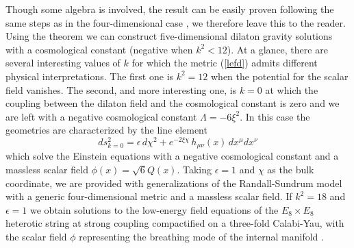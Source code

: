 \documentclass[prd,a4paper,twocolumn,superscriptaddress,nofootinbib,showpacs]{revtex4}
\begin{document}
Though some algebra is involved, the result can be easily proven
 following the same steps as in the four-dimensional case \cite{fonarev},  
we therefore  leave this to the reader. Using the  theorem we can construct five-dimensional dilaton 
gravity solutions with a cosmological
constant (negative when $k^{2}<12$). At a glance, there are several interesting values
of $k$ for which the metric (\ref{lefd}) admits different physical interpretations. The first
one is $k^2=12$ when the potential for the scalar field vanishes. The second, and more interesting one, is
$k=0$ at which the coupling between the dilaton field and the cosmological constant is zero and we are left
with a negative cosmological constant $\Lambda=-6\xi^2$. In this case the geometries are characterized by 
the line element
\begin{equation}
ds^2_{k=0}=\epsilon\,d\chi^2+e^{-2\xi \chi}\,h_{\mu\nu}(x)\,dx^{\mu}dx^{\nu}
\label{rsun}
\end{equation}
which solve the Einstein equations with a negative cosmological constant and a massless scalar field 
$\phi(x)=\sqrt{6}Q(x)$.  Taking $\epsilon=1$ and $\chi$ as the bulk coordinate, we are 
provided with generalizations of the 
Randall-Sundrum model with a generic four-dimensional metric and a massless scalar field.
If $k^2=18$ and $\epsilon=1$ we obtain solutions to the low-energy field
equations of the $E_{8}\times E_{8}$ heterotic string at strong coupling compactified
on a three-fold Calabi-Yau, with the scalar
field $\phi$ representing the breathing mode of the internal manifold \cite{losw,jim}.
\end{document}
